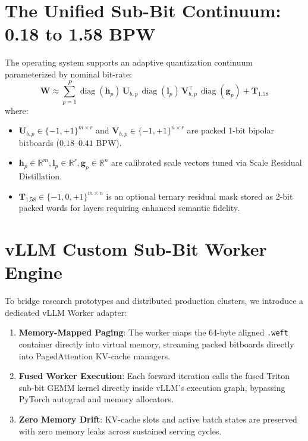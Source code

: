 \documentclass[11pt,a4paper]{article}
\begin{document}
\section{The Unified Sub-Bit Continuum: 0.18 to 1.58 BPW}
The operating system supports an adaptive quantization continuum parameterized by nominal bit-rate:
\begin{equation}
\mathbf{W} \approx \sum_{p=1}^P \operatorname{diag}(\mathbf{h}_p) \, \mathbf{U}_{b,p} \, \operatorname{diag}(\mathbf{l}_p) \, \mathbf{V}_{b,p}^\top \, \operatorname{diag}(\mathbf{g}_p) + \mathbf{T}_{1.58}
\end{equation}
where:
\begin{itemize}
    \item $\mathbf{U}_{b,p} \in \{-1, +1\}^{m \times r}$ and $\mathbf{V}_{b,p} \in \{-1, +1\}^{n \times r}$ are packed 1-bit bipolar bitboards ($0.18$–$0.41$ BPW).
    \item $\mathbf{h}_p \in \mathbb{R}^m, \mathbf{l}_p \in \mathbb{R}^r, \mathbf{g}_p \in \mathbb{R}^n$ are calibrated scale vectors tuned via Scale Residual Distillation.
    \item $\mathbf{T}_{1.58} \in \{-1, 0, +1\}^{m \times n}$ is an optional ternary residual mask stored as 2-bit packed words for layers requiring enhanced semantic fidelity.
\end{itemize}

\section{vLLM Custom Sub-Bit Worker Engine}
To bridge research prototypes and distributed production clusters, we introduce a dedicated vLLM Worker adapter:
\begin{enumerate}
    \item \textbf{Memory-Mapped Paging}: The worker maps the 64-byte aligned \texttt{.weft} container directly into virtual memory, streaming packed bitboards directly into PagedAttention KV-cache managers.
    \item \textbf{Fused Worker Execution}: Each forward iteration calls the fused Triton sub-bit GEMM kernel directly inside vLLM's execution graph, bypassing PyTorch autograd and memory allocators.
    \item \textbf{Zero Memory Drift}: KV-cache slots and active batch states are preserved with zero memory leaks across sustained serving cycles.
\end{enumerate}
\end{document}
